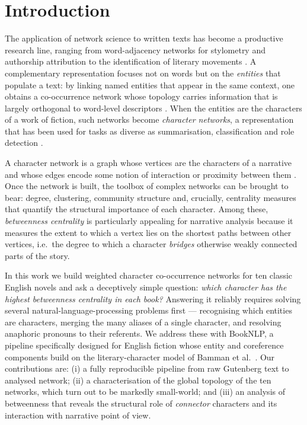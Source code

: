 \documentclass[preprint,12pt]{elsarticle}
\begin{document}
\section{Introduction}
\label{sec:intro}

The application of network science to written texts has become a productive
research line, ranging from word-adjacency networks for stylometry and
authorship attribution to the identification of literary movements
\cite{amancio2015stylometry,amancio2015shorttexts,amancio2012movements}. A
complementary representation focuses not on words but on the \emph{entities} that
populate a text: by linking named entities that appear in the same context, one
obtains a co-occurrence network whose topology carries information that is
largely orthogonal to word-level descriptors \cite{amancio2016entity}. When the
entities are the characters of a work of fiction, such networks become
\emph{character networks}, a representation that has been used for tasks as
diverse as summarisation, classification and role detection
\cite{labatut2019survey,elson2010social}.

A character network is a graph whose vertices are the characters of a narrative
and whose edges encode some notion of interaction or proximity between them
\cite{labatut2019survey}. Once the network is built, the toolbox of complex
networks can be brought to bear: degree, clustering, community structure and,
crucially, centrality measures that quantify the structural importance of each
character. Among these, \emph{betweenness centrality}
\cite{freeman1977betweenness,brandes2001betweenness} is particularly appealing
for narrative analysis because it measures the extent to which a vertex lies on
the shortest paths between other vertices, i.e.\ the degree to which a character
\emph{bridges} otherwise weakly connected parts of the story.

In this work we build weighted character co-occurrence networks for ten classic
English novels and ask a deceptively simple question: \emph{which character has
the highest betweenness centrality in each book?} Answering it reliably requires
solving several natural-language-processing problems first --- recognising which
entities are characters, merging the many aliases of a single character, and
resolving anaphoric pronouns to their referents. We address these with BookNLP,
a pipeline specifically designed for English fiction whose entity and
coreference components build on the literary-character model of Bamman et
al.\ \cite{bamman2014character}. Our contributions are: (i) a fully reproducible
pipeline from raw Gutenberg text to analysed network; (ii) a characterisation of
the global topology of the ten networks, which turn out to be markedly
small-world; and (iii) an analysis of betweenness that reveals the structural
role of \emph{connector} characters and its interaction with narrative point of
view.
\end{document}
